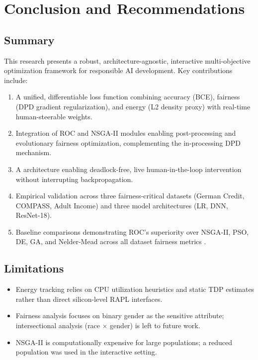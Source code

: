 \documentclass[12pt,a4paper]{article}
\begin{document}
\section{Conclusion and Recommendations}

\subsection{Summary}

This research presents a robust, architecture-agnostic, interactive multi-objective optimization framework for responsible AI development. Key contributions include:

\begin{enumerate}
    \item A unified, differentiable loss function combining accuracy (BCE), fairness (DPD gradient regularization), and energy (L2 density proxy) with real-time human-steerable weights.
    \item Integration of ROC and NSGA-II modules enabling post-processing and evolutionary fairness optimization, complementing the in-processing DPD mechanism.
    \item A   architecture enabling deadlock-free, live human-in-the-loop intervention without interrupting backpropagation.
    \item Empirical validation across three fairness-critical datasets (German Credit, COMPASS, Adult Income) and three model architectures (LR, DNN, ResNet-18).
    \item Baseline comparisons demonstrating ROC's superiority over NSGA-II, PSO, DE, GA, and Nelder-Mead across all dataset fairness metrics \cite{nagpal2024multiobj}.
\end{enumerate}

\subsection{Limitations}

\begin{itemize}
    \item Energy tracking relies on CPU utilization heuristics and static TDP estimates rather than direct silicon-level RAPL interfaces.
    \item Fairness analysis focuses on binary gender as the sensitive attribute; intersectional analysis (race $\times$ gender) is left to future work.
    \item NSGA-II is computationally expensive for large populations; a reduced population was used in the interactive setting.
\end{itemize}
\end{document}
